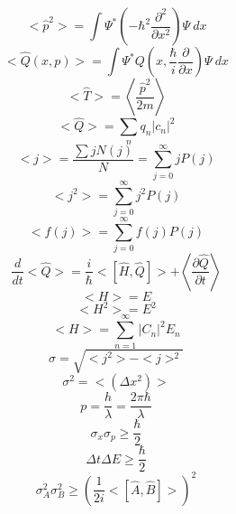 \documentclass[10pt]{article}
\begin{document}
\begin{multicols}{3}
\begin{equation*}
<\hat{p}^2>=\int \Psi^{*}\left(-\hbar^2\frac{\partial^2}{\partial x^2}\right)\Psi  \ dx
\end{equation*}
\begin{equation*}
<\hat{Q}(x,p)>=\int \Psi^{*}Q\left(x,\frac{\hbar}{i}\frac{\partial}{\partial x}\right)\Psi  \ dx
\end{equation*}
\begin{equation*}
<\hat{T}>=\left<\frac{\hat{p}^2}{2m}\right>
\end{equation*}
\begin{equation*}
<\hat{Q}>=\sum_{n}q_n|c_n|^2
\end{equation*}
\begin{equation*}
<j>=\frac{\sum jN(j)}{N}=\sum_{j=0}^{\infty}jP(j)
\end{equation*}
\begin{equation*}
<j^2>=\sum_{j=0}^{\infty}j^2P(j)
\end{equation*}
\begin{equation*}
<f(j)>=\sum_{j=0}^{\infty}f(j)P(j)
\end{equation*}
\begin{equation*}
\frac{d}{dt}<\hat{Q}>=\frac{i}{\hbar}<[\hat{H},\hat{Q}]>+\left<\frac{\partial \hat{Q}}{\partial t}\right>
\end{equation*}
\begin{equation*}
<H>=E
\end{equation*}
\begin{equation*}
<H^2>=E^2
\end{equation*}
\begin{equation*}
<H>=\sum_{n=1}^{\infty} |C_n|^2E_n
\end{equation*}
\begin{equation*}
\sigma=\sqrt{<j^2>-<j>^2}
\end{equation*}
\begin{equation*}
\sigma^2=<(\Delta x^2)>
\end{equation*}
\begin{equation*}
p=\frac{h}{\lambda}=\frac{2\pi \hbar}{\lambda}
\end{equation*}
\begin{equation*}
\sigma_x\sigma_p\geq\frac{\hbar}{2}
\end{equation*}
\begin{equation*}
\Delta t\Delta E \geq \frac{\hbar}{2}
\end{equation*}
\begin{equation*}
\sigma_{A}^{2}\sigma_{B}^{2} \geq \left(\frac{1}{2i}<[\hat{A},\hat{B}]>\right)^2

\end{equation*}
\end{multicols}
\end{document}
